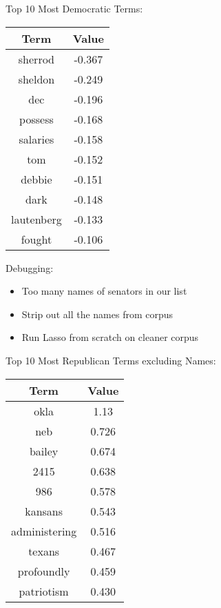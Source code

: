 \documentclass[xcolor=pdftex,dvipsnames,table]{beamer}
\begin{document}
\frame
{
	Top 10 Most Democratic Terms:
	\begin{table}[htdp]
	\begin{center}
	\begin{tabular}{|c|c|}
	\hline
	Term & Value \\ 
	\hline
	sherrod & -0.367 \\
	sheldon & -0.249 \\
	dec & -0.196 \\
	possess & -0.168 \\
	salaries & -0.158 \\
	tom & -0.152 \\
	debbie & -0.151 \\
	dark & -0.148 \\
	lautenberg & -0.133 \\
	fought & -0.106 \\
	\hline
	\end{tabular}
	\end{center}
	\label{default}
	\end{table}
}

\frame
{
	Debugging:
	\begin{itemize}
		\item{Too many names of senators in our list}
		\item{Strip out all the names from corpus}
		\item{Run Lasso from scratch on cleaner corpus}
	\end{itemize}
}

\frame
{
	Top 10 Most Republican Terms excluding Names:
	\begin{table}[htdp]
	\begin{center}
	\begin{tabular}{|c|c|}
	\hline
	Term & Value \\ 
	\hline
	okla & 1.13 \\
	neb & 0.726 \\
	bailey & 0.674 \\
	2415 & 0.638 \\
	986 & 0.578 \\
	kansans & 0.543 \\
	administering & 0.516 \\
	texans & 0.467 \\
	profoundly & 0.459 \\
	patriotism & 0.430 \\
	\hline
	\end{tabular}
	\end{center}
	\label{default}
	\end{table}
}
\end{document}
